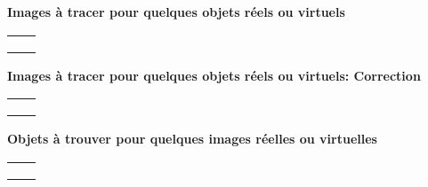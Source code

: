 \documentclass{article}
\newcommand{\titre}[1]{
\begin{center}
  {\Large\textbf{#1}}
\end{center}

}
\begin{document}
\newpage
\setcounter{page}{1}
\titre{Images \`a tracer pour quelques objets r\'eels ou virtuels}
\begin{tabular}{|c|c|}
\hline
&\\ \hline
&\\ \hline
&\\ \hline
&\\ \hline
\end{tabular}


\newpage


\titre{Images \`a tracer pour quelques objets r\'eels ou virtuels: Correction}
\begin{tabular}{|c|c|}
\hline
&\\ \hline
&\\ \hline
&\\ \hline
&\\ \hline
\end{tabular}


\newpage

\titre{Objets \`a trouver pour quelques images r\'eelles ou virtuelles}
\begin{tabular}{|c|c|}
\hline
&\\ \hline
&\\ \hline
&\\ \hline
&\\ \hline
\end{tabular}


\newpage
\end{document}
